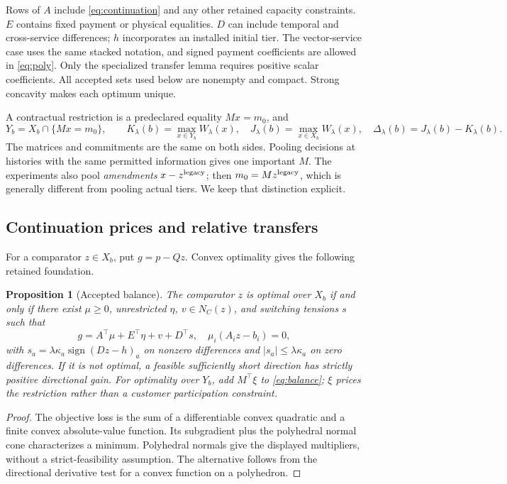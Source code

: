 \documentclass[11pt,letterpaper]{article}
\newtheorem{proposition}[theorem]{Proposition}
\theoremstyle{definition}\newtheorem{assumption}[theorem]{Assumption}
\begin{document}
Rows of $A$ include \eqref{eq:continuation} and any other retained capacity constraints. $E$ contains fixed payment or physical equalities. $D$ can include temporal and cross-service differences; $h$ incorporates an installed initial tier. The vector-service case uses the same stacked notation, and signed payment coefficients are allowed in \eqref{eq:poly}. Only the specialized transfer lemma requires positive scalar coefficients. All accepted sets used below are nonempty and compact. Strong concavity makes each optimum unique.

A contractual restriction is a predeclared equality $Mx=m_0$, and
\begin{equation}\label{eq:values}
 Y_b=X_b\cap\{Mx=m_0\},\qquad
 K_\lambda(b)=\max_{x\in Y_b}W_\lambda(x),\quad
 J_\lambda(b)=\max_{x\in X_b}W_\lambda(x),\quad
 \Delta_\lambda(b)=J_\lambda(b)-K_\lambda(b).
\end{equation}
The matrices and commitments are the same on both sides. Pooling decisions at histories with the same permitted information gives one important $M$. The experiments also pool \emph{amendments} $x-z^{\rm legacy}$; then $m_0=Mz^{\rm legacy}$, which is generally different from pooling actual tiers. We keep that distinction explicit.

\subsection{Continuation prices and relative transfers}
For a comparator $z\in X_b$, put $g=p-Qz$. Convex optimality gives the following retained foundation.
\begin{proposition}[Accepted balance]\label{prop:balance}
The comparator $z$ is optimal over $X_b$ if and only if there exist $\mu\geq0$, unrestricted $\eta$, $v\in N_C(z)$, and switching tensions $s$ such that
\begin{equation}\label{eq:balance}
 g=A^\top\mu+E^\top\eta+v+D^\top s,\quad
 \mu_i(A_i z-b_i)=0,
\end{equation}
with $s_a=\lambda\kappa_a\operatorname{sign}(Dz-h)_a$ on nonzero differences and $|s_a|\leq\lambda\kappa_a$ on zero differences. If it is not optimal, a feasible sufficiently short direction has strictly positive directional gain. For optimality over $Y_b$, add $M^\top\xi$ to \eqref{eq:balance}; $\xi$ prices the restriction rather than a customer participation constraint.
\end{proposition}
\begin{proof}
The objective loss is the sum of a differentiable convex quadratic and a finite convex absolute-value function. Its subgradient plus the polyhedral normal cone characterizes a minimum. Polyhedral normals give the displayed multipliers, without a strict-feasibility assumption. The alternative follows from the directional derivative test for a convex function on a polyhedron.\end{proof}
\end{document}

